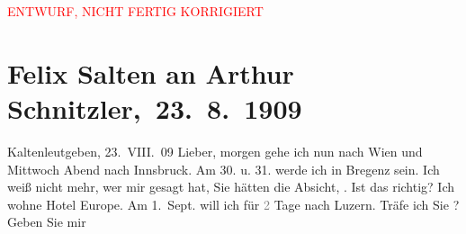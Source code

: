 
\begin{center}
            \textcolor{red}{ENTWURF, NICHT FERTIG KORRIGIERT}
                      \end{center}
            
         
         \renewcommand{\erwaehntePersonen}{Personen: Lili Cappellini, Anna Katharina Rehmann, Ottilie Salten, Paul Salten, Heinrich Schnitzler, Olga Schnitzler}
         \renewcommand{\erwaehnteOrte}{Orte: Bregenz, Gütsch, Hotel de l’Europe, Innsbruck, Kaltenleutgeben, Salzburg, Wien}
         \renewcommand{\erwaehnteWerke}{}
               \section[ Felix Salten an Arthur Schnitzler, 23. 8. 1909]{ Felix Salten an Arthur Schnitzler, 23. 8. 1909}\nopagebreak{}\rehead{ }\begin{ledgroupsized}[t]{13cm}\normalsize\beginnumbering \toendnotes[C]{\smallbreak\pagebreak[2]} 
\toendnotes[C]{\smallbreak}\pstart
           \raggedleft{}{\pb}Kaltenleutgeben, 23. VIII. 09\pend
           \pstart
           Lieber,{ }morgen gehe ich nun nach Wien und Mittwoch{ }Abend nach Innsbruck. Am 30. u. 31. werde ich in
                  Bregenz sein. Ich weiß nicht mehr, wer mir
               gesagt hat, Sie hätten die Absicht, \label{K_L03506-1v}\label{K_L03506-1h}. Ist das richtig? Ich wohne Hotel Europe. Am 1. Sept. will ich für \textcolor{gray}{2} Tage nach Luzern. Träfe ich Sie \label{K_L03506-2v}\label{K_L03506-2h}? Geben Sie mir

\end{ledgroupsized}
